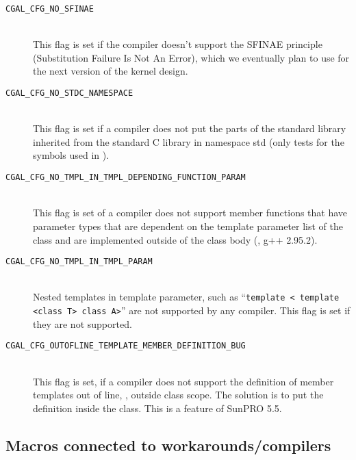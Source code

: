 \begin{description}
\item[{\tt CGAL\_CFG\_NO\_SFINAE}]~\\ 
  This flag is set if the compiler doesn't support the SFINAE
  principle (Substitution Failure Is Not An Error), which we
  eventually plan to use for the next version of the kernel design.
 
\item[{\tt CGAL\_CFG\_NO\_STDC\_NAMESPACE}]~\\ 
  This flag is set if a compiler does not put the parts of the
  standard library inherited from the standard C library in namespace
  {\ccFont std} (only tests for the symbols used in \cgal).
 
\item[{\tt CGAL\_CFG\_NO\_TMPL\_IN\_TMPL\_DEPENDING\_FUNCTION\_PARAM}]~\\
  This flag is set of a compiler does not support member functions
  that have parameter types that are dependent on the template
  parameter list of the class and are implemented outside of the class
  body (\eg, g++ 2.95.2).
  
\item[{\tt CGAL\_CFG\_NO\_TMPL\_IN\_TMPL\_PARAM}]~\\
  Nested templates in template parameter, such as ``\texttt{template <
    template <class T> class A>}'' are not supported by any compiler.
  This flag is set if they are not supported.

\item[{\tt CGAL\_CFG\_OUTOFLINE\_TEMPLATE\_MEMBER\_DEFINITION\_BUG}]~\\
  This flag is set, if a compiler does not support the definition of
  member templates out of line, \ie, outside class scope. The solution
  is to put the definition inside the class. This is a feature of
  SunPRO 5.5.

\end{description}

\subsection{Macros connected to workarounds/compilers}
\label{sec:workaround_macros}

